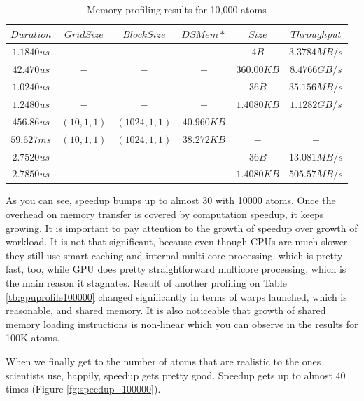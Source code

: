 \documentclass[12pt,letterpaper]{report}
\begin{document}
\begin{table}[h!]
	\renewcommand*{\arraystretch}{1.5}
	\tabcolsep=0.12cm
  \centering
  \begin{tabular}{| c | c | c | c | c | c |}
   \hline
   
$Duration $ & $ Grid Size $ & $ Block Size $ & $ DSMem* $ & $ Size $ & $ Throughput  $ \\ \hline
$1.1840us $ & $ - $ & $ - $ & $ - $ & $ 4B $ & $ 3.3784MB/s  $ \\ \hline
$42.470us $ & $ - $ & $ - $ & $ - $ & $ 360.00KB $ & $ 8.4766GB/s  $ \\ \hline
$1.0240us $ & $ - $ & $ - $ & $ - $ & $ 36B $ & $ 35.156MB/s  $ \\ \hline
$1.2480us $ & $ - $ & $ - $ & $ - $ & $ 1.4080KB $ & $ 1.1282GB/s  $ \\ \hline
$456.86us $ & $ (10,1,1) $ & $ (1024,1,1) $ & $ 40.960KB $ & $ - $ & $ -  $ \\ \hline
$59.627ms $ & $ (10,1,1) $ & $ (1024,1,1) $ & $ 38.272KB $ & $ - $ & $ -  $ \\ \hline
$2.7520us $ & $ - $ & $ - $ & $ - $ & $ 36B $ & $ 13.081MB/s  $ \\ \hline
$2.7850us $ & $ - $ & $ - $ & $ - $ & $ 1.4080KB $ & $ 505.57MB/s$ \\ 

	\hline

  \end{tabular}
    \caption{Memory profiling results for 10,000 atoms}
    	  \label{tb:gpumem10000}
\end{table}


\noindent\hspace{3em}As you can see, speedup bumps up to almost 30 with 10000 atoms. Once the overhead on memory transfer is covered by computation speedup, it keeps growing. It is important to pay attention to the growth of speedup over growth of workload. It is not that significant, because even though CPUs are much slower, they still use smart caching and internal multi-core processing, which is pretty fast, too, while GPU does pretty straightforward multicore processing, which is the main reason it stagnates.
Result of another profiling on Table \ref{tb:gpuprofile100000} changed significantly in terms of warps launched, which is reasonable, and shared memory. It is also noticeable that growth of shared memory loading instructions is non-linear which you can observe in the results for 100K atoms.

\noindent\hspace{3em}When we finally get to the number of atoms that are realistic to the ones scientists use, happily, speedup gets pretty good. Speedup gets up to almost 40 times (Figure \ref{fg:speedup_100000}).
\end{document}
